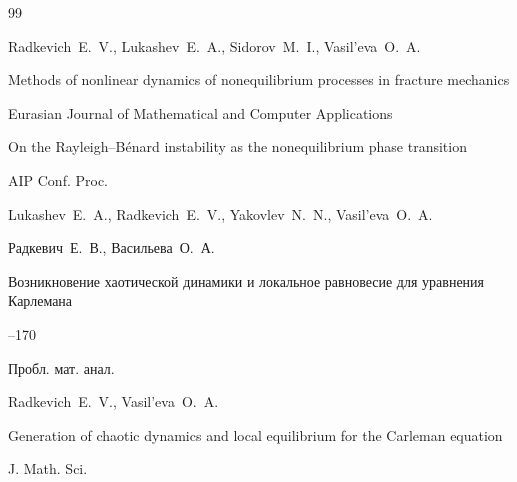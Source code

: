 \begin{thebibliography}{99}




\by Radkevich~E.~V., Lukashev~E.~A., Sidorov~M.~I., Vasil'eva~O.~A.

\paper Methods of nonlinear dynamics of nonequilibrium processes in fracture mechanics 

\jour Eurasian Journal of Mathematical and Computer Applications




\toappear






\paper On the Rayleigh–Bénard instability as the nonequilibrium phase transition

\jour AIP Conf. Proc. 






\by Lukashev~E.~A., Radkevich~E.~V.,  Yakovlev~N.~N.,  Vasil'eva~O.~A.







\by Радкевич~Е.~В., Васильева~О.~А.

\paper Возникновение хаотической динамики и локальное равновесие для уравнения Карлемана  

--170

\jour Пробл. мат. анал.



\transl

\by Radkevich~E.~V., Vasil’eva~O.~A.

\paper Generation of chaotic dynamics and local equilibrium for the Carleman equation

\jour J. Math. Sci.


\end{thebibliography}
